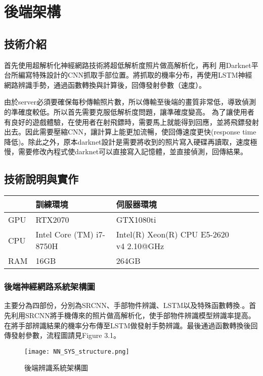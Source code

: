 \chapter{後端架構}
\section{技術介紹}
首先使用超解析化神經網路技術將超低解析度照片做高解析化，再利 用Darknet平台所編寫特殊設計的CNN抓取手部位置。將抓取的機率分布，再使用LSTM神經網路辨識手勢，通過函數轉換與計算後，回傳發射參數（速度）。

由於server必須要確保每秒傳輸照片數，所以傳輸至後端的畫質非常低，導致偵測的準確度較低。所以首先需要克服低解析度問題，讓準確度變高。
為了讓使用者有良好的遊戲體驗，在使用者在射飛鏢時，需要馬上就能得到回應，並將飛鏢發射出去。因此需要壓縮CNN，讓計算上能更加流暢，使回傳速度更快(response time降低)。除此之外，原本darknet設計是需要將收到的照片寫入硬碟再讀取，速度極慢，需要修改內程式使darknet可以直接寫入記憶體，並直接偵測，回傳結果。


\section{技術說明與實作}


\begin{table}[]
\begin{tabular}{|l|l|l|l|l|}
\hline
    & 訓練環境                 & 伺服器環境                        \\\hline
GPU & RTX2070                  & GTX1080ti                                     \\\hline
CPU & Intel Core (TM) i7-8750H & Intel(R) Xeon(R) CPU E5-2620 v4  2.10@GHz     \\\hline
RAM & 16GB                     & 264GB                                   
\\\hline
\end{tabular}
\end{table}


\subsection{後端神經網路系統架構圖}

主要分為四部份，分別為SRCNN、手部物件辨識、LSTM以及特殊函數轉換.。首先利用SRCNN將手機傳來的照片做高解析化，使手部物件辨識模型辨識率提高。在將手部辨識結果的機率分布傳至LSTM做發射手勢辨識。最後通過函數轉換後回傳發射參數，流程圖請見Figure 3.1。

\begin{figure}[H]
    \centering
    \texttt{[image: NN\_SYS\_structure.png]}
    \caption{後端辨識系統架構圖}
    \label{fig:後端辨識系統架構圖}
\end{figure}


